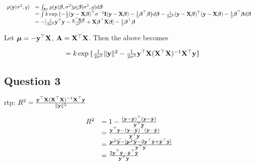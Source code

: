 \documentclass{amsart}[12pt]
\theoremstyle{definition}
\begin{document}
\begin{equation*}
	\begin{array}{ll}
		p({\bf y} | \sigma^2, g) & = \int_{{\mathbb R}^p} p({\bf y} | {\boldsymbol \beta}, \sigma^2) p({\boldsymbol \beta} | \sigma^2, g) d {\boldsymbol \beta}                                                                                                                                                       \\
		                     & = \int k \exp{\{ - \tfrac{1}{2} ({\bf y}- {\bf X}{\boldsymbol\beta})^\top \sigma^{-2} {\bf I}({\bf y}- {\bf X}{\boldsymbol\beta}) -  \tfrac{1}{2} {\boldsymbol\beta}^\top {\boldsymbol\beta}\}} d {\boldsymbol \beta} - \frac{1}{2 \sigma^2} ({\bf y} - {\bf X} {\boldsymbol \beta})^\top ({\bf y} - {\bf X} {\boldsymbol \beta}) -\tfrac{1}{2} {\boldsymbol \beta}^\top {\boldsymbol\beta} d {\boldsymbol \beta} \\
		                     & = -[\frac{1}{2 \sigma^2} {\bf y}^\top {\bf y} - \frac{{\bf y}^\top {\bf X} {\boldsymbol\beta}}{\sigma^2} + {\bf X} {\boldsymbol \beta}^\top {\bf X} {\boldsymbol\beta}] - \tfrac{1}{2} {\boldsymbol \beta}^\top {\boldsymbol\beta}                                                                                           
	\end{array}
\end{equation*}

Let ${\boldsymbol \mu} = -{\bf y}^\top {\bf X}$, ${\bf A} = {\bf X}^\top {\bf X}$. Then the above becomes

\begin{equation*}
	\begin{array}{ll}
		  & = k \exp{ \{ \frac{1}{2 \sigma^2} \| {\bf y}\|^2 - \frac{1}{2 \sigma^2} {\bf y}^\top {\bf X}({\bf X}^\top {\bf X})^{-1} {\bf X}^\top {\bf y}\} } 
	\end{array}
\end{equation*}

\subsection{Question 3}

rtp: $R^2 = \frac{{\bf y}^\top {\bf X} ({\bf X}^\top {\bf X})^{-1} {\bf X}^\top {\bf y}}{\| {\bf y} \|^2}$

\begin{equation*}
	\begin{array}{ll}
		R^2 & = 1 - \frac{({\bf y} - \hat{{\bf y}})^\top ({\bf y} - \hat{{\bf y}})}{{\bf y}^\top {\bf y}}                                                      \\
		    & = \frac{{\bf y}^\top {\bf y} - ({\bf y} - \hat{{\bf y}})^\top ({\bf y} - \hat{{\bf y}})}{{\bf y}^\top {\bf y}}                                           \\
		    & = \frac{\cancel{{\bf y}^\top {\bf y}} - [\cancel{{\bf y}^\top {\bf y}} - 2 {\bf y}^\top \hat{{\bf y}} + \hat{{\bf y}}^\top \hat{{\bf y}}]}{{\bf y}^\top {\bf y}} \\
		    & = \frac{2 {\bf y}^\top \hat{{\bf y}} - \hat{{\bf y}}^\top \hat{{\bf y}}}{{\bf y}^\top {\bf y}}                                                   
	\end{array}
\end{equation*}
\end{document}
